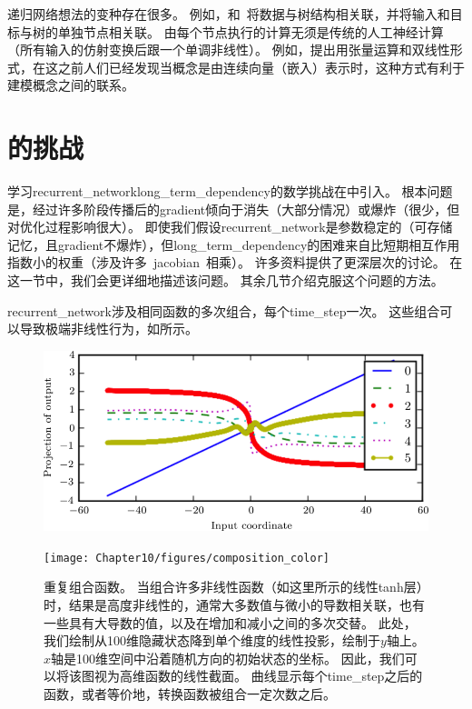 递归网络想法的变种存在很多。
例如，\cite{Frasconi-et-al-1997}和~\cite{Frasconi-et-al-1998}将数据与树结构相关联，并将输入和目标与树的单独节点相关联。
由每个节点执行的计算无须是传统的人工神经计算（所有输入的仿射变换后跟一个单调非线性）。
例如，\cite{Socher-et-al-2013a}提出用张量运算和双线性形式，在这之前人们已经发现当概念是由连续向量（嵌入）表示时，这种方式有利于建模概念之间的联系\citep{Weston-et-al-2010,Bordes-et-al-2012}。

\section{的挑战}
\label{sec:the_challenge_of_long_term_dependencies}
学习\gls{recurrent_network}\gls{long_term_dependency}的数学挑战在中引入。
根本问题是，经过许多阶段传播后的\gls{gradient}倾向于消失（大部分情况）或爆炸（很少，但对优化过程影响很大）。
即使我们假设\gls{recurrent_network}是参数稳定的（可存储记忆，且\gls{gradient}不爆炸），但\gls{long_term_dependency}的困难来自比短期相互作用指数小的权重（涉及许多~\gls{jacobian}~相乘）。
许多资料提供了更深层次的讨论\citep{Hochreiter-1991,Doya-1993,Bengio-et-al-1994,Pascanu-et-al-2013}。
在这一节中，我们会更详细地描述该问题。
其余几节介绍克服这个问题的方法。


\gls{recurrent_network}涉及相同函数的多次组合，每个\gls{time_step}一次。
这些组合可以导致极端非线性行为，如所示。
\begin{figure}[!htb]
\ifOpenSource
\centerline{\includegraphics[scale=0.5]{images/103.png}}
\else
\centerline{\texttt{[image: Chapter10/figures/composition\_color]}}
\fi
\caption{重复组合函数。
当组合许多非线性函数（如这里所示的线性tanh层）时，结果是高度非线性的，通常大多数值与微小的导数相关联，也有一些具有大导数的值，以及在增加和减小之间的多次交替。%
此处，我们绘制从100维隐藏状态降到单个维度的线性投影，绘制于$y$轴上。
$x$轴是100维空间中沿着随机方向的初始状态的坐标。
因此，我们可以将该图视为高维函数的线性截面。
曲线显示每个\gls{time_step}之后的函数，或者等价地，转换函数被组合一定次数之后。
}
\label{fig:chap10_composition_color}
\end{figure}

